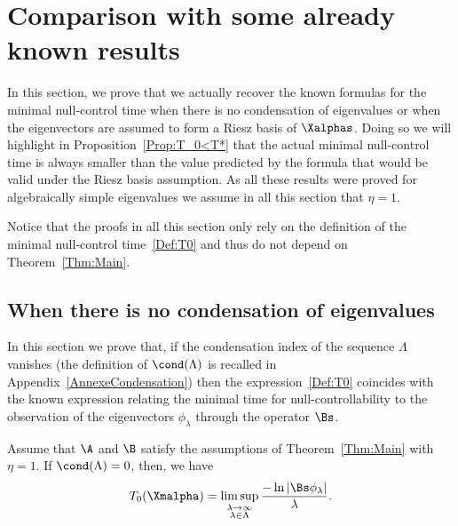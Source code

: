 \section{Comparison with some already known results} \label{Sec:AutresExpressions}

In this section, we prove that we actually recover the known formulas for the minimal null-control time when there is no condensation of eigenvalues or when the eigenvectors are assumed to form a Riesz basis of $\Xalphas$. Doing so we will highlight in Proposition~\ref{Prop:T_0<T*} that the actual minimal null-control time is always smaller than the value predicted by the formula that would be valid under the Riesz basis assumption. As all these results were proved for algebraically simple eigenvalues we assume in all this section that $\eta=1$.

Notice that the proofs in all this section only rely on the definition of the minimal null-control time~\eqref{Def:T0} and thus do not depend on Theorem~\ref{Thm:Main}.


\subsection{When there is no condensation of eigenvalues} \label{Subsec:NoCondensation}

In this section we prove that, if the condensation index of the sequence $\Lambda$ vanishes (the definition of $\cond(\Lambda)$ is recalled in Appendix~\ref{AnnexeCondensation}) then the expression~\eqref{Def:T0} coincides with the known expression relating the minimal time for null-controllability to the observation of the eigenvectors $\phi_\lambda$ through the operator $\Bs$.

\begin{prop}
Assume that $\A$ and $\B$ satisfy the assumptions of Theorem~\ref{Thm:Main} with $\eta=1$. If $\cond(\Lambda) =0$, then, we have
\[
T_{0}(\Xmalpha)=\limsup_{\substack{\lambda\to \infty\\ \lambda\in \Lambda}} \frac{-\ln \left| \Bs \phi_\lambda \right|}{\lambda}.
\]
\end{prop}

